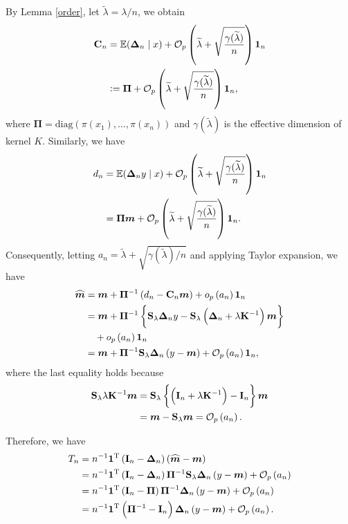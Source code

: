 \documentclass[12pt]{article}
\newcommand{\bx}{{x}}
\newcommand{\bd}{{d}}
\newcommand{\by}{{y}}
\newcommand{\bmm}{\bm{m}}
\newcommand{\bI}{\mathbf{I}}
\newcommand{\bC}{\mathbf{C}}
\newcommand{\bK}{\mathbf{K}}
\newcommand{\bS}{\mathbf{S}}
\newcommand{\bone}{\mathbf{1}}
\newcommand{\bDelta}{\boldsymbol{\Delta}}
\newcommand{\bPi}{\boldsymbol{\Pi}}
\def\trans{^{\rm T}}
\def\wh{\widehat}
\def\wt{\widetilde}
\begin{document}
By Lemma \ref{order}, let $\wt{\lambda} = \lambda/n$, we obtain
\begin{align}
\bC_{n} &= \mathbb{E}(\bDelta_{n} \mid \bx) + \mathcal{O}_{p}\left( \wt{\lambda} + \sqrt{\frac{ \gamma(\wt{\lambda})  }{n} } \right )\bone_{n} \notag \\
&:= \bPi + \mathcal{O}_{p}\left( \wt{\lambda} + \sqrt{\frac{ \gamma(\wt{\lambda})  }{n} } \right )\bone_{n},\notag
\end{align}
where $\bPi = \mbox{diag}(\pi(\bx_{1}), \ldots, \pi(\bx_{n}))$ and 
 $\gamma(\wt{\lambda})$ is the effective dimension of kernel $K$. Similarly, we have 
\begin{align}
\bd_{n} &= \mathbb{E}(\bDelta_{n}\by \mid \bx) + \mathcal{O}_{p}\left( \wt{\lambda} + \sqrt{\frac{ \gamma(\wt{\lambda})  }{n} }\right)\bone_{n} \notag \\
&= \bPi\bmm + \mathcal{O}_{p}\left( \wt{\lambda} + \sqrt{\frac{ \gamma(\wt{\lambda})  }{n} } \right )\bone_{n}.\notag
\end{align}
Consequently, letting $a_n = \wt{\lambda} +  \sqrt{\gamma(\wt{\lambda})/n} $ and applying 
 Taylor expansion, we have
\begin{align}
 \wh{\bmm} &= \bmm + \bPi^{-1} \left(    \bd_{n} - \bC_{n}\bmm      \right) + o_{p}\left( a_n  \right )\bone_{n}\notag\\ 
 &= \bmm + \bPi^{-1} \left\{   \bS_{\lambda}\bDelta_{n}\by - \bS_{\lambda}\left( \bDelta_{n} + \lambda\bK^{-1}   \right)\bmm      \right\} \notag\\
 &\quad+ o_{p}\left( a_n  \right )\bone_{n}\notag \\
 &= \bmm + \bPi^{-1} \bS_{\lambda}\bDelta_{n}  \left(  \by - \bmm      \right) + \mathcal{O}_{p}\left(a_n  \right )\bone_{n},\notag
 \end{align}
where the last equality holds because 
\begin{align}
\bS_{\lambda} \lambda\bK^{-1}\bmm &= \bS_{\lambda}\left\{ \left( \bI_{n} + \lambda\bK^{-1} \right) - \bI_{n}  \right\}\bmm \notag \\
&= \bmm -  \bS_{\lambda} \bmm = \mathcal{O}_{p}\left( a_n  \right ). \notag 
\end{align}

Therefore, we have
 \begin{align}
T_{n} &= n^{-1} \bone\trans \left(\bI_{n} - \bDelta_{n}\right) (\wh{\bmm} - \bmm) \notag \\
&= {n}^{-1} \bone\trans \left(\bI_{n} - \bDelta_{n}\right) \bPi^{-1} \bS_{\lambda}\bDelta_{n}  \left(  \by - \bmm      \right) +  \mathcal{O}_{p}\left( a_n  \right)\notag \\
& = n^{-1} \bone\trans \left(\bI_{n} -  \bPi \right) \bPi^{-1} \bDelta_{n}  \left(  \by - \bmm      \right) +  \mathcal{O}_{p}\left( a_n  \right) \notag \\
 &= n^{-1} \bone\trans \left(\bPi^{-1} - \bI_{n}\right) \bDelta_{n}  \left(  \by - \bmm      \right) +  \mathcal{O}_{p}\left( a_n  \right)
\notag. 
\end{align}
\end{document}
